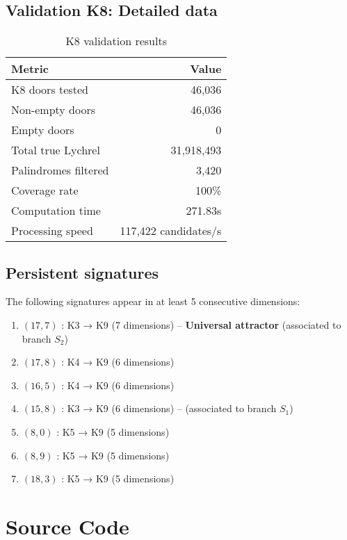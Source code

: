 \documentclass[12pt,a4paper]{article}
\theoremstyle{remark}
\begin{document}
\subsection{Validation K8: Detailed data}

\begin{table}[h]
\centering
\caption{K8 validation results}
\begin{tabular}{lr}
\toprule
\textbf{Metric} & \textbf{Value} \\
\midrule
K8 doors tested & 46,036 \\
Non-empty doors & 46,036 \\
Empty doors & 0 \\
Total true Lychrel & 31,918,493\\
Palindromes filtered & 3,420 \\
Coverage rate & 100\% \\
Computation time & 271.83s \\
Processing speed & 117,422 candidates/s \\
\bottomrule
\end{tabular}
\end{table}

\subsection{Persistent signatures}

The following signatures appear in at least 5 consecutive dimensions:

\begin{enumerate}
\item $(17, 7)$ : K3 → K9 (7 dimensions) -- \textbf{Universal attractor} (associated to branch $S_2$)
\item $(17, 8)$ : K4 → K9 (6 dimensions)
\item $(16, 5)$ : K4 → K9 (6 dimensions)
\item $(15, 8)$ : K3 → K9 (6 dimensions) -- (associated to branch $S_1$)
\item $(8, 0)$ : K5 → K9 (5 dimensions)
\item $(8, 9)$ : K5 → K9 (5 dimensions)
\item $(18, 3)$ : K5 → K9 (5 dimensions)
\end{enumerate}

\section{Source Code}
\label{app:code_en}
\end{document}
